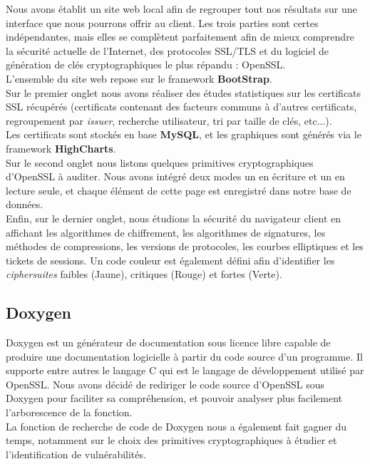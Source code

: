 Nous avons établit un site web local afin de regrouper tout nos résultats sur une interface que nous pourrons offrir au client. Les trois parties sont certes indépendantes, mais elles se complètent parfaitement afin de mieux comprendre la sécurité actuelle de l'Internet, des protocoles SSL/TLS et du logiciel de génération de clés cryptographiques le plus répandu : OpenSSL.\\
L'ensemble du site web repose sur le framework \textbf{BootStrap}.\\
Sur le premier onglet nous avons réaliser des études statistiques sur les certificats SSL récupérés (certificats contenant des facteurs communs à d'autres certificats, regroupement par \textit{issuer}, recherche utilisateur, tri par taille de clés, etc...).\\
Les certificats sont stockés en base \textbf{MySQL}, et les graphiques sont générés via le framework \textbf{HighCharts}.\\
Sur le second onglet nous listons quelques primitives cryptographiques d'OpenSSL à auditer. Nous avons intégré deux modes un en écriture et un en lecture seule, et chaque élément de cette page est enregistré dans notre base de données.\\
Enfin, sur le dernier onglet, nous étudions la sécurité du navigateur client en affichant les algorithmes de chiffrement, les algorithmes de signatures, les méthodes de compressions, les versions de protocoles, les courbes elliptiques et les tickets de sessions. Un code couleur est également défini afin d'identifier les \textit{ciphersuites} faibles (Jaune), critiques (Rouge) et fortes (Verte).

\subsection{Doxygen}

Doxygen est un générateur de documentation sous licence libre capable de produire une documentation logicielle à partir du code source d'un programme. Il supporte entre autres le langage C qui est le langage de développement utilisé par OpenSSL. Nous avons décidé de rediriger le code source d'OpenSSL sous Doxygen pour faciliter sa compréhension, et pouvoir analyser plus facilement l'arborescence de la fonction.\\
La fonction de recherche de code de Doxygen nous a également fait gagner du temps, notamment sur le choix des primitives cryptographiques à étudier et l'identification de vulnérabilités.\\


